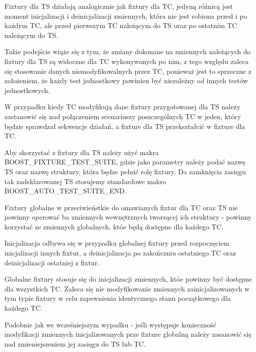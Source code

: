 \documentclass[12pt,a4paper,notitlepage]{report}
\begin{document}
Fixtury dla TS działają analogicznie jak fixtury dla TC, jedyną róźnicą jest moment inicjalizacji i deinicjalizacji zmiennych, która nie jest robiona przed i po każdym TC, ale przed pierwszym TC należącym do TS oraz po ostatnim TC należącym do TS.

Takie podejście wiąże się z tym, że zmiany dokonane na zmiennych należących do fixtury dla TS są widoczne dla TC wykonywanych po nim, z tego względu zaleca się stosowanie danych niemodyfikowalnych przez TC, ponieważ jest to sprzeczne z założeniem, że każdy test jednostkowy powinien być niezależny od innych testów jednostkowych.

W przypadku kiedy TC modyfikują dane fixtury przygotowanej dla TS należy zastanowić się nad połączeniem scenariuszy poszczególnych TC w jeden, który będzie sprawdzał sekwencje działań, a fixture dla TS przekształcić w fixture dla TC.

Aby skorzystać z fixtury dla TS należy użyć makra BOOST{\_}FIXTURE{\_}TEST{\_}SUITE, gdzie jako parametry należy podać nazwę TS oraz nazwę struktury, która będze pełnić rolę fixtury. Do zamknięcia zasięgu tak zadeklarowanej TS stosujemy standardowe makro BOOST{\_}AUTO{\_}TEST{\_}SUITE{\_}END.

			

Fixtury globalne w przeciwieństkie do omawianych fixtur dla TC oraz TS nie powinny operować ba zmiennych wewnętrznych tworzącej ich struktury - powinny korzystać ze zmiennych globalnych, któe będą dostępne dla każdego TC.

Inicjalizacja odbywa się w przypadku globalnej fixtury przed rozpoczęciem inicjalizacji innych fixtur, a deinicjalizacja po zakończniu ostatniego TC oraz deinicjalizacji ostatniej z fixtur.

Globalne fixtury stosuje się do inicjalizacji zmiennych, któe powinny być dostępne dla wszystkich TC. Zaleca się nie modyfikowanie zmiennych zainicjalizowanych w tym typie fixtury w celu zapewnienia identycznego stanu początkowego dla każdego TC.

Podobnie jak we wcześniejszym wypadku - jeśli występuje konieczność modyfikacji zmiennych inicjalizowanych prze fixture globalną należy zasanowić się nad zmieniejszeniem jej zasięgu do TS lub TC.
\end{document}
